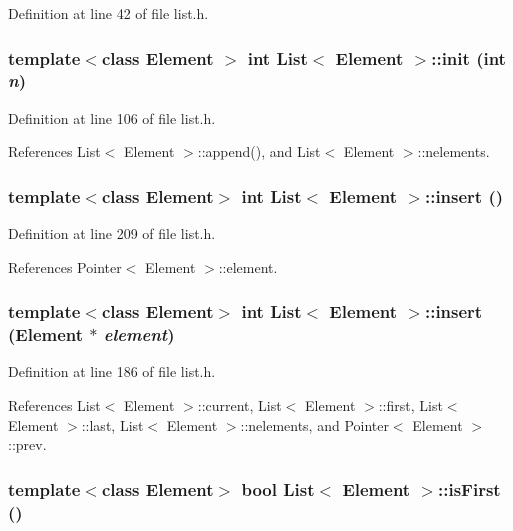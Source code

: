 Definition at line 42 of file list.h.\hypertarget{classList_3e35a7778134a389e6bc935869efb2ba}{
\subsubsection[{init}]{\setlength{\rightskip}{0pt plus 5cm}template$<$class Element $>$ int {\bf List}$<$ Element $>$::init (int {\em n})}}
\label{classList_3e35a7778134a389e6bc935869efb2ba}




Definition at line 106 of file list.h.

References List$<$ Element $>$::append(), and List$<$ Element $>$::nelements.\hypertarget{classList_3e0734f98d7a50f15323f9b6131a2503}{
\subsubsection[{insert}]{\setlength{\rightskip}{0pt plus 5cm}template$<$class Element$>$ int {\bf List}$<$ Element $>$::insert ()}}
\label{classList_3e0734f98d7a50f15323f9b6131a2503}




Definition at line 209 of file list.h.

References Pointer$<$ Element $>$::element.\hypertarget{classList_77411bba9fc76562ff903493ccf059a0}{
\subsubsection[{insert}]{\setlength{\rightskip}{0pt plus 5cm}template$<$class Element$>$ int {\bf List}$<$ Element $>$::insert (Element $\ast$ {\em element})}}
\label{classList_77411bba9fc76562ff903493ccf059a0}




Definition at line 186 of file list.h.

References List$<$ Element $>$::current, List$<$ Element $>$::first, List$<$ Element $>$::last, List$<$ Element $>$::nelements, and Pointer$<$ Element $>$::prev.\hypertarget{classList_3cdb77229517a14bd028316d401be814}{
\subsubsection[{isFirst}]{\setlength{\rightskip}{0pt plus 5cm}template$<$class Element$>$ bool {\bf List}$<$ Element $>$::isFirst ()}}
\label{classList_3cdb77229517a14bd028316d401be814}




